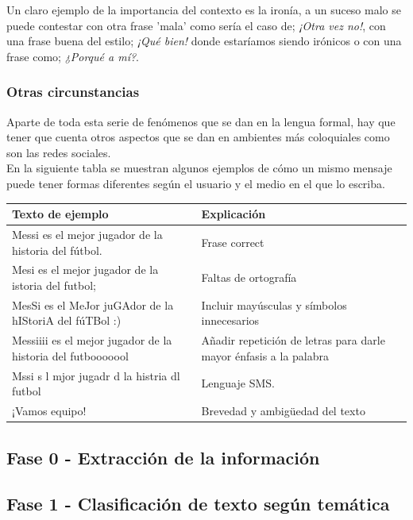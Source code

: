 \documentclass[../all.tex]{subfiles}
\begin{document}
	Un claro ejemplo de la importancia del contexto es la ironía, a un suceso malo se puede contestar con otra frase 'mala' como sería el caso de; \textit{¡Otra vez no!}, con una frase buena del estilo; \textit{¡Qué bien!} donde estaríamos siendo irónicos o con una frase como; \textit{¿Porqué a mí?}.
	
\newpage
\subsubsection{Otras circunstancias}

	Aparte de toda esta serie de fenómenos que se dan en la lengua formal, hay que tener que cuenta otros aspectos que se dan en ambientes más coloquiales como son las redes sociales.\\
	
	En la siguiente tabla se muestran algunos ejemplos de cómo un mismo mensaje puede tener formas diferentes según el usuario y el medio en el que lo escriba.
	\begin{center}
		\begin{tabular}{ | m{7cm}| m{7cm} | } 
			\hline
			\textbf{Texto de ejemplo} & \textbf{Explicación}\\ 
			\hline
			Messi es el mejor jugador de la historia del fútbol. & Frase correct \\ 
			\hline
			Mesi es el mejor jugador de la istoria del futbol; & Faltas de ortografía\\ 
			\hline
			MesSi es el MeJor juGAdor de la hIStoriA del fúTBol :) & Incluir mayúsculas y símbolos innecesarios\\ 
			\hline
			Messiiii es el mejor jugador de la historia del futbooooool & Añadir repetición de letras para darle mayor énfasis a la palabra\\ 
			\hline
			Mssi s l mjor jugadr d la histria dl futbol  & Lenguaje SMS.\\ 
			\hline
			¡Vamos equipo! & Brevedad y ambigüedad del texto \\ 
			\hline
		\end{tabular}
	\end{center}

\newpage
\subsection{Fase 0 - Extracción de la información}


\newpage
\subsection{Fase 1 - Clasificación de texto según temática}
\end{document}
